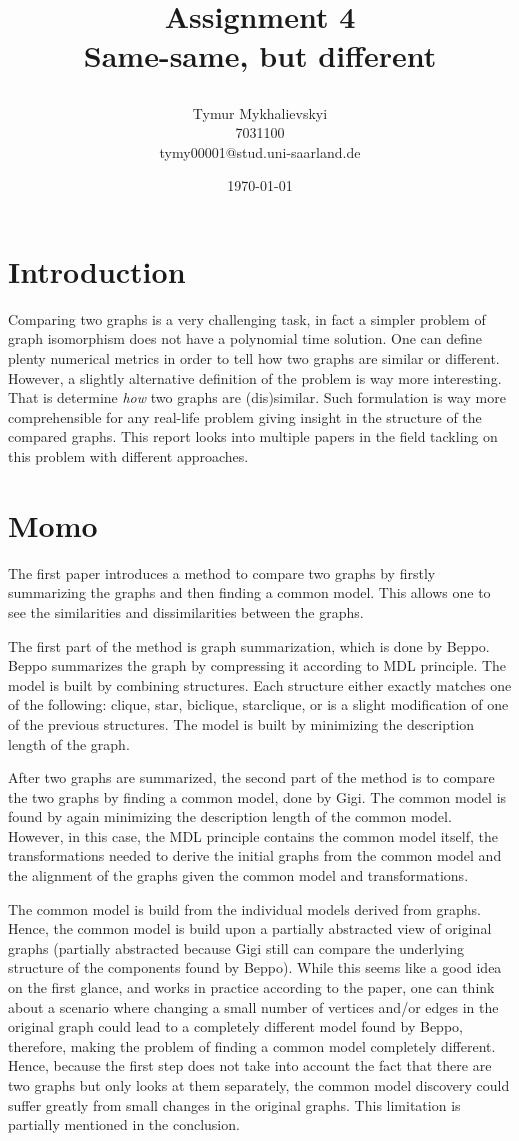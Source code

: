 \documentclass{article}
\title{\vspace{-2cm}Assignment 4\\
    Same-same, but different

    }
\author{Tymur Mykhalievskyi\\ 7031100\\ tymy00001@stud.uni-saarland.de}
\date{\today}
\begin{document}
\maketitle

\section{Introduction}
Comparing two graphs is a very challenging task, in fact a simpler problem of graph isomorphism does not have a polynomial time solution. One can define plenty numerical metrics in order to tell how two graphs are similar or different. However, a slightly alternative definition of the problem is way more interesting. That is determine \emph{how} two graphs are (dis)similar. Such formulation is way more comprehensible for any real-life problem giving insight in the structure of the compared graphs. This report looks into multiple papers in the field tackling on this problem with different approaches.

\section{Momo}
The first paper \citep{coupette2021momo} introduces a method to compare two graphs by firstly summarizing the graphs and then finding a common model. This allows one to see the similarities and dissimilarities between the graphs.

The first part of the method is graph summarization, which is done by Beppo. Beppo summarizes the graph by compressing it according to MDL principle. The model is built by combining structures. Each structure either exactly matches one of the following: clique, star, biclique, starclique, or is a slight modification of one of the previous structures. The model is built by minimizing the description length of the graph.

After two graphs are summarized, the second part of the method is to compare the two graphs by finding a common model, done by Gigi. The common model is found by again minimizing the description length of the common model. However, in this case, the MDL principle contains the common model itself, the transformations needed to derive the initial graphs from the common model and the alignment of the graphs given the common model and transformations.

The common model is build from the individual models derived from graphs. Hence, the common model is build upon a partially abstracted view of original graphs (partially abstracted because Gigi still can compare the underlying structure of the components found by Beppo). While this seems like a good idea on the first glance, and works in practice according to the paper, one can think about a scenario where changing a small number of vertices and/or edges in the original graph could lead to a completely different model found by Beppo, therefore, making the problem of finding a common model completely different. Hence, because the first step does not take into account the fact that there are two graphs but only looks at them separately, the common model discovery could suffer greatly from small changes in the original graphs. This limitation is partially mentioned in the conclusion.
\end{document}
